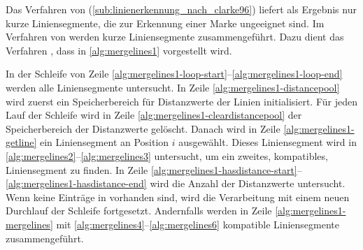 
Das Verfahren von \citeauthor{clarke96} (\autoref{sub:linienerkennung_nach_clarke96}) liefert als Ergebnis nur kurze
 Liniensegmente, die zur Erkennung einer Marke ungeeignet sind. Im Verfahren von \citeauthor{hirzer08} werden kurze
 Liniensegmente zusammengeführt. Dazu dient das Verfahren , dass in \autoref{alg:mergelines1}
 vorgestellt wird.

In der Schleife von Zeile \ref{alg:mergelines1-loop-start}--\ref{alg:mergelines1-loop-end} werden alle Liniensegmente
 untersucht. In Zeile \ref{alg:mergelines1-distancepool} wird zuerst ein Speicherbereich für Distanzwerte der Linien
 initialisiert. Für jeden Lauf der Schleife wird in Zeile \ref{alg:mergelines1-cleardistancepool} der Speicherbereich
 der Distanzwerte gelöscht. Danach wird in Zeile \ref{alg:mergelines1-getline} ein Liniensegment an Position $i$
 ausgewählt. Dieses Liniensegment wird in \autoref{alg:mergelines2}--\autoref{alg:mergelines3} untersucht, um ein
 zweites, kompatibles, Liniensegment zu finden. In Zeile
 \ref{alg:mergelines1-hasdistance-start}--\ref{alg:mergelines1-hasdistance-end} wird die Anzahl der Distanzwerte
 untersucht. Wenn keine Einträge in  vorhanden sind, wird die Verarbeitung mit einem neuen
 Durchlauf der Schleife fortgesetzt. Andernfalls werden in Zeile \ref{alg:mergelines1-mergelines} mit
 \autoref{alg:mergelines4}--\autoref{alg:mergelines6} kompatible Liniensegmente zusammengeführt.

